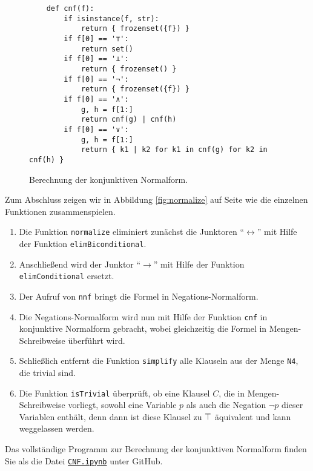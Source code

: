 \begin{figure}[!ht]
  \centering
\begin{verbatim}
    def cnf(f):
        if isinstance(f, str): 
            return { frozenset({f}) }
        if f[0] == '⊤':
            return set()
        if f[0] == '⊥':
            return { frozenset() }
        if f[0] == '¬':
            return { frozenset({f}) }
        if f[0] == '∧':
            g, h = f[1:]
            return cnf(g) | cnf(h)
        if f[0] == '∨':
            g, h = f[1:]
            return { k1 | k2 for k1 in cnf(g) for k2 in cnf(h) }
\end{verbatim}
\vspace*{-0.3cm}
  \caption{Berechnung der konjunktiven Normalform. }
  \label{fig:cnf}
\end{figure}

Zum Abschluss zeigen wir in Abbildung \ref{fig:normalize} auf Seite \pageref{fig:normalize}
wie die einzelnen Funktionen zusammenspielen.
\begin{enumerate}
\item Die Funktion \texttt{normalize} eliminiert zunächst die Junktoren ``$\leftrightarrow$''
      mit Hilfe der Funktion \texttt{elimBiconditional}.
\item Anschließend wird der Junktor  ``$\rightarrow$'' mit Hilfe der Funktion \texttt{elimConditional}
      ersetzt.      
\item Der Aufruf von \texttt{nnf} bringt die Formel in Negations-Normalform.
\item Die Negations-Normalform wird nun mit Hilfe der Funktion \texttt{cnf} in konjunktive Normalform gebracht,
      wobei gleichzeitig die Formel in Mengen-Schreibweise überführt wird.  
\item Schließlich entfernt die Funktion \texttt{simplify} alle Klauseln aus der Menge \texttt{N4}, die trivial
      sind.
\item Die Funktion \texttt{isTrivial} überprüft, ob eine Klausel $C$, die in Mengen-Schreibweise vorliegt,
      sowohl eine Variable $p$ als auch die Negation $\neg p$ dieser Variablen enthält, denn dann ist diese
      Klausel zu $\top$ äquivalent und kann weggelassen werden.
\end{enumerate}
Das vollständige Programm zur Berechnung der konjunktiven Normalform finden Sie als die Datei
\href{https://github.com/karlstroetmann/Logic/blob/master/Python/CNF.ipynb}{\texttt{CNF.ipynb}} 
unter GitHub.

